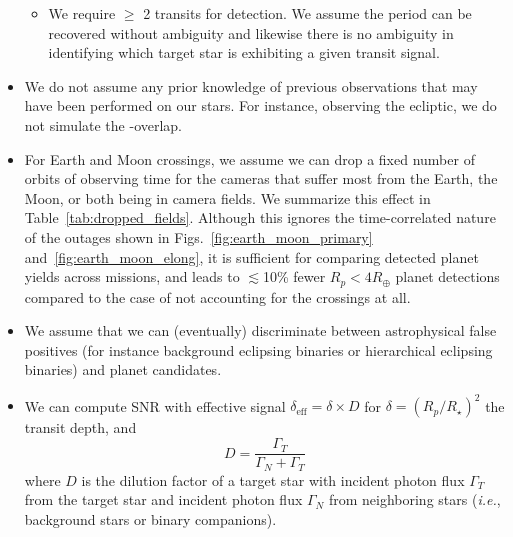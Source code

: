\begin{itemize}
\begin{itemize}
	\item We require $\geq$ 2 transits for detection.  We assume
          the period can be recovered without ambiguity and likewise
          there is no ambiguity in identifying which target star is
          exhibiting a given transit signal.
          
	\end{itemize}

	\item We do not assume any prior knowledge of previous
          observations that may have been performed on our stars.  For
          instance, observing the ecliptic, we do not simulate the
          \tess\!-\ktwo overlap.
          
	\item For Earth and Moon crossings, we assume we can drop a
          fixed number of orbits of observing time for the cameras
          that suffer most from the Earth, the Moon, or both being in
          \tesss camera fields. We summarize this effect in
          Table~\ref{tab:dropped_fields}. Although this ignores the
          time-correlated nature of the outages shown in
          Figs.~\ref{fig:earth_moon_primary}
          and~\ref{fig:earth_moon_elong}, it is sufficient for
          comparing detected planet yields across missions, and
          leads to $\lesssim$10\% fewer $R_p<4R_\oplus$ planet 
          detections compared to the case of not accounting for the 
          crossings at all.
          
	\item We assume that we can (eventually) discriminate between
          astrophysical false positives (for instance background
          eclipsing binaries or hierarchical eclipsing binaries) and
          planet candidates.
          
	\item We can compute SNR with effective signal
          $\delta_\text{eff} = \delta \times D$ for
          $\delta=(R_p/R_\star)^2$ the transit depth, and
	  \begin{equation}
	D = \frac{\Gamma_T}{\Gamma_N + \Gamma_T}
	\label{eq:dilution}
	\end{equation}
	where $D$ is the dilution factor of a target star with
        incident photon flux $\Gamma_T$ from the target star and
        incident photon flux $\Gamma_N$ from neighboring stars 
        (\textit{i.e.}, background stars or binary companions).
	

\end{itemize}
